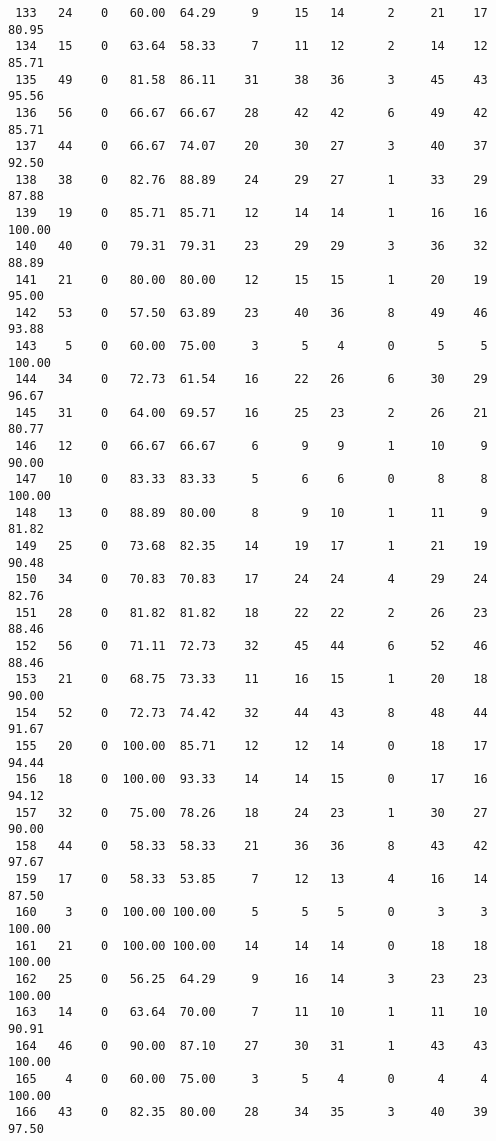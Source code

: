 \begin{verbatim}
 133   24    0   60.00  64.29     9     15   14      2     21    17    80.95
 134   15    0   63.64  58.33     7     11   12      2     14    12    85.71
 135   49    0   81.58  86.11    31     38   36      3     45    43    95.56
 136   56    0   66.67  66.67    28     42   42      6     49    42    85.71
 137   44    0   66.67  74.07    20     30   27      3     40    37    92.50
 138   38    0   82.76  88.89    24     29   27      1     33    29    87.88
 139   19    0   85.71  85.71    12     14   14      1     16    16   100.00
 140   40    0   79.31  79.31    23     29   29      3     36    32    88.89
 141   21    0   80.00  80.00    12     15   15      1     20    19    95.00
 142   53    0   57.50  63.89    23     40   36      8     49    46    93.88
 143    5    0   60.00  75.00     3      5    4      0      5     5   100.00
 144   34    0   72.73  61.54    16     22   26      6     30    29    96.67
 145   31    0   64.00  69.57    16     25   23      2     26    21    80.77
 146   12    0   66.67  66.67     6      9    9      1     10     9    90.00
 147   10    0   83.33  83.33     5      6    6      0      8     8   100.00
 148   13    0   88.89  80.00     8      9   10      1     11     9    81.82
 149   25    0   73.68  82.35    14     19   17      1     21    19    90.48
 150   34    0   70.83  70.83    17     24   24      4     29    24    82.76
 151   28    0   81.82  81.82    18     22   22      2     26    23    88.46
 152   56    0   71.11  72.73    32     45   44      6     52    46    88.46
 153   21    0   68.75  73.33    11     16   15      1     20    18    90.00
 154   52    0   72.73  74.42    32     44   43      8     48    44    91.67
 155   20    0  100.00  85.71    12     12   14      0     18    17    94.44
 156   18    0  100.00  93.33    14     14   15      0     17    16    94.12
 157   32    0   75.00  78.26    18     24   23      1     30    27    90.00
 158   44    0   58.33  58.33    21     36   36      8     43    42    97.67
 159   17    0   58.33  53.85     7     12   13      4     16    14    87.50
 160    3    0  100.00 100.00     5      5    5      0      3     3   100.00
 161   21    0  100.00 100.00    14     14   14      0     18    18   100.00
 162   25    0   56.25  64.29     9     16   14      3     23    23   100.00
 163   14    0   63.64  70.00     7     11   10      1     11    10    90.91
 164   46    0   90.00  87.10    27     30   31      1     43    43   100.00
 165    4    0   60.00  75.00     3      5    4      0      4     4   100.00
 166   43    0   82.35  80.00    28     34   35      3     40    39    97.50

\end{verbatim}
